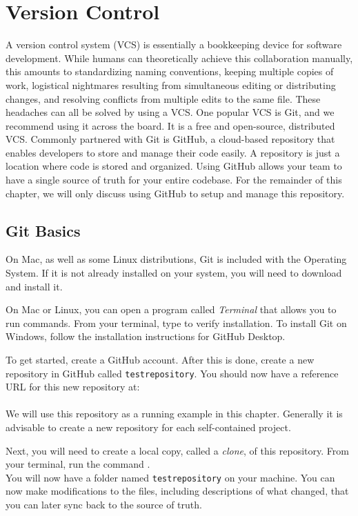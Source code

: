 \section{Version Control}
A version control system (VCS) is essentially a bookkeeping device for software development.
While humans can theoretically achieve this collaboration manually, this amounts to standardizing naming conventions, keeping multiple copies of work, logistical nightmares resulting from simultaneous editing or distributing changes, and resolving conflicts from multiple edits to the same file.
These headaches can all be solved by using a VCS.
One popular VCS is Git, and we recommend using it across the board. It is a free and open-source, distributed VCS. Commonly partnered with Git is GitHub, a cloud-based repository that enables developers to store and manage their code easily. A repository is just a location where code is stored and organized. Using GitHub allows your team to have a single source of truth for your entire codebase. For the remainder of this chapter, we will only discuss using GitHub to setup and manage this repository.

\subsection{Git Basics}
On Mac, as well as some Linux distributions, Git is included with the Operating System. If it is not already installed on your system, you will need to download and install it.

On Mac or Linux, you can open a program called \textit{Terminal} that allows you to run commands. From your terminal, type  to verify installation.
To install Git on Windows, follow the installation instructions for GitHub Desktop.

To get started, create a GitHub account. After this is done, create a new repository in GitHub called \texttt{test\textunderscore repository}. You should now have a reference URL for this new repository at:\\ \\
We will use this repository as a running example in this chapter.
Generally it is advisable to create a new repository for each self-contained project.

Next, you will need to create a local copy, called a \textit{clone}, of this repository. From your terminal, run the command .\\
You will now have a folder named \texttt{test\textunderscore repository} on your machine.
You can now make modifications to the files, including descriptions of what changed, that you can later sync back to the source of truth.

